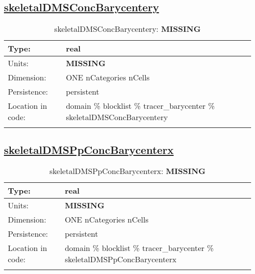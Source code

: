 \subsection[skeletalDMSConcBarycentery]{\hyperref[sec:var_tab_tracer_barycenter]{skeletalDMSConcBarycentery}}
\label{subsec:var_sec_tracer_barycenter_skeletalDMSConcBarycentery}
\begin{center}
\begin{longtable}{| p{2.0in} | p{4.0in} |}
        \hline 
        Type: & real \\
        \hline 
        Units: & {\bf \color{red} MISSING} \\
        \hline 
        Dimension: & ONE nCategories nCells \\
        \hline 
        Persistence: & persistent \\
        \hline 
         Location in code: & domain \% blocklist \% tracer\_barycenter \% skeletalDMSConcBarycentery \\
         \hline 
    \caption{skeletalDMSConcBarycentery: {\bf \color{red} MISSING}}
\end{longtable}
\end{center}
\subsection[skeletalDMSPpConcBarycenterx]{\hyperref[sec:var_tab_tracer_barycenter]{skeletalDMSPpConcBarycenterx}}
\label{subsec:var_sec_tracer_barycenter_skeletalDMSPpConcBarycenterx}
\begin{center}
\begin{longtable}{| p{2.0in} | p{4.0in} |}
        \hline 
        Type: & real \\
        \hline 
        Units: & {\bf \color{red} MISSING} \\
        \hline 
        Dimension: & ONE nCategories nCells \\
        \hline 
        Persistence: & persistent \\
        \hline 
         Location in code: & domain \% blocklist \% tracer\_barycenter \% skeletalDMSPpConcBarycenterx \\
         \hline 
    \caption{skeletalDMSPpConcBarycenterx: {\bf \color{red} MISSING}}
\end{longtable}
\end{center}
